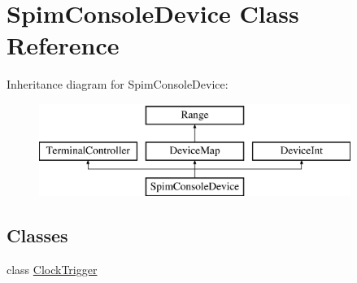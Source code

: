 \hypertarget{classSpimConsoleDevice}{
\section{SpimConsoleDevice Class Reference}
\label{classSpimConsoleDevice}
}
Inheritance diagram for SpimConsoleDevice:\begin{figure}[H]
\begin{center}
\leavevmode
\includegraphics[height=3cm]{classSpimConsoleDevice}
\end{center}
\end{figure}
\subsection*{Classes}
\begin{DoxyCompactItemize}
\item 
class \hyperlink{classSpimConsoleDevice_1_1ClockTrigger}{ClockTrigger}
\end{DoxyCompactItemize}
